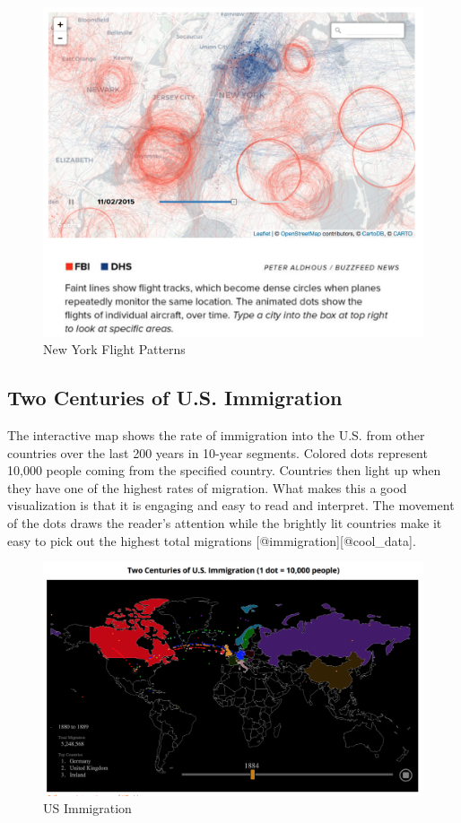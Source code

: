 \documentclass[]{book}
\theoremstyle{definition}
\theoremstyle{definition}
\theoremstyle{definition}
\theoremstyle{remark}
\begin{document}
\begin{figure}
\centering
\includegraphics{images/NYCflights.png}
\caption{New York Flight Patterns}
\end{figure}

\subsection{Two Centuries of U.S.
Immigration}\label{two-centuries-of-u.s.-immigration}

The interactive map shows the rate of immigration into the U.S. from
other countries over the last 200 years in 10-year segments. Colored
dots represent 10,000 people coming from the specified country.
Countries then light up when they have one of the highest rates of
migration. What makes this a good visualization is that it is engaging
and easy to read and interpret. The movement of the dots draws the
reader's attention while the brightly lit countries make it easy to pick
out the highest total migrations {[}@immigration{]}{[}@cool\_data{]}.

\begin{figure}
\centering
\includegraphics{images/immigration.png}
\caption{US Immigration}
\end{figure}
\end{document}
